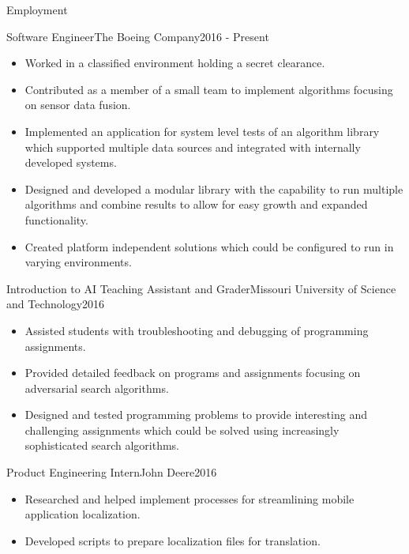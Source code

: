 \documentclass[]{mcdowellcv}
\begin{document}
\makeheader

\begin{cvsection}{Employment}

\begin{boeing}
    \begin{cvsubsection}{Software Engineer}{The Boeing Company}{2016 - Present}         
        \begin{itemize}
            \item Worked in a classified environment holding a secret clearance.
            \item Contributed as a member of a small team to implement algorithms focusing on sensor data fusion.
            \item Implemented an application for system level tests of an algorithm library which supported multiple data sources and integrated with internally developed systems. 
            \item Designed and developed a modular library with the capability to run multiple algorithms and combine results to allow for easy growth and expanded functionality.
            \item Created platform independent solutions which could be configured to run in varying environments.
        \end{itemize}
    \end{cvsubsection}
\end{boeing}
    
\begin{aigrader}
    \begin{cvsubsection}[2]{Introduction to AI Teaching Assistant and Grader}{Missouri University of Science and Technology}{2016}   
        \begin{itemize}
            \item Assisted students with troubleshooting and debugging of programming assignments.
            \item Provided detailed feedback on programs and assignments focusing on adversarial search algorithms.
            \item Designed and tested programming problems to provide interesting and challenging assignments which could be solved using increasingly sophisticated search algorithms.
        \end{itemize}
    \end{cvsubsection}
\end{aigrader}

\begin{johndeere}
    \begin{cvsubsection}{Product Engineering Intern}{John Deere}{2016}
        \begin{itemize}
            \item Researched and helped implement processes for streamlining mobile application localization.
            \item Developed scripts to prepare localization files for translation.
        \end{itemize}
    \end{cvsubsection}
\end{johndeere}
    

\end{cvsection}
\end{document}
